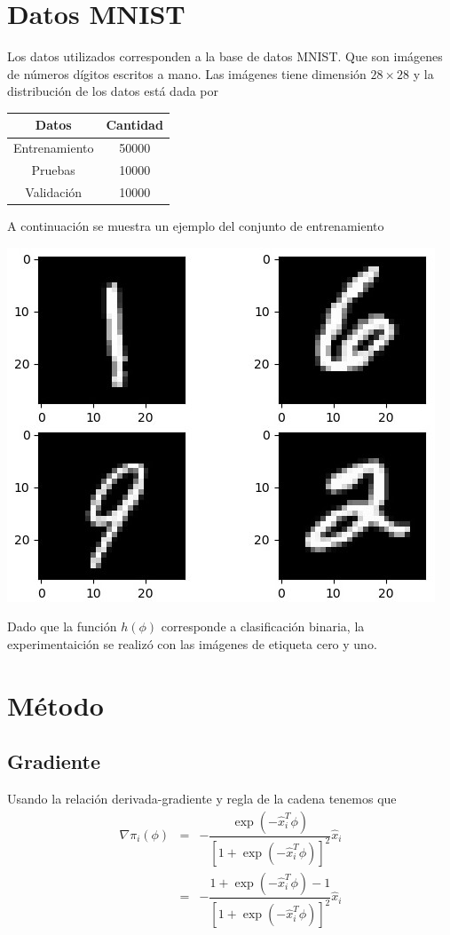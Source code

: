 \documentclass[11pt,letterpaper]{article}
\theoremstyle{definition}
\theoremstyle{definition}
\theoremstyle{definition}
\begin{document}
\section{Datos MNIST}
Los datos utilizados corresponden a la base de datos MNIST. Que son imágenes de números dígitos escritos a mano. Las imágenes tiene  dimensión $ 28 \times 28 $ y la distribución de los datos está dada por
\begin{center}
	\begin{tabular}{|c|c|}
	\hline
	Datos & Cantidad \\
	\hline
	Entrenamiento & 50000 \\
	\hline
	Pruebas & 10000 \\
	\hline
	Validación & 10000 \\
	\hline
\end{tabular}
\end{center}
A continuación se muestra un ejemplo del conjunto de entrenamiento
\begin{center}
	\includegraphics[width=0.8\linewidth]{graficas/example}
\end{center}
Dado que la función $ h(\phi) $ corresponde a clasificación binaria, la experimentaición se realizó con las imágenes de etiqueta cero y uno.
\section{Método}
\subsection{Gradiente}
Usando la relación derivada-gradiente y regla de la cadena tenemos que
\begin{eqnarray*}
	\nabla \pi_i (\phi) & = & - \dfrac{\exp(-\hat{x}_i^T \phi)}{[1 + \exp(-\hat{x}_i^T \phi)]^2} \hat{x}_i \\
						& = & - \dfrac{1 + \exp(-\hat{x}_i^T \phi) - 1}{[1 + \exp(-\hat{x}_i^T \phi)]^2} \hat{x}_i
\end{eqnarray*}
\end{document}
